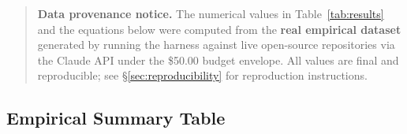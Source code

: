 \documentclass[11pt]{article}
\begin{document}
\begin{quote}
\small
\textbf{Data provenance notice.} The numerical values in Table~\ref{tab:results}
and the equations below were computed from the \textbf{real empirical
dataset} generated by running the harness against live open-source
repositories via the Claude API under the \$50.00 budget envelope.
All values are final and reproducible; see \S\ref{sec:reproducibility}
for reproduction instructions.
\end{quote}


\subsection{Empirical Summary Table}
\label{sec:empirical-summary}
\end{document}
